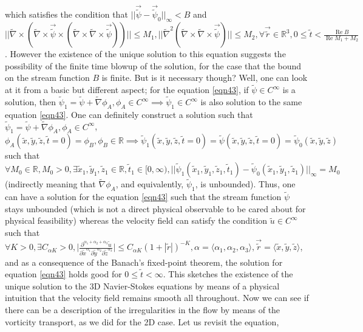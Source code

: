 \documentclass{article}
\begin{document}
which satisfies the condition that $||\vec{\tilde{\psi}}-\vec{\tilde{\psi}}_0||_{\infty}<B$ and $\bigg|\bigg|\tilde{\nabla} \times (\tilde{\nabla} \times \vec{\tilde{\psi}} \times(\tilde{\nabla} \times \tilde{\nabla} \times \vec{\tilde{\psi}}))\bigg|\bigg| \le M_1, \bigg|\bigg|\tilde{\nabla}^2(\tilde{\nabla}\times \tilde{\nabla} \times \vec{\tilde{\psi}})\bigg|\bigg| \le M_2, \forall \vec{\tilde{r}} \in \mathbb{R}^3, 0 \le \tilde{t} < \frac{\operatorname{Re} B}{\operatorname{Re} M_1 + M_2}$. However the existence of the unique solution to this equation suggests the possibility of the finite time blowup of the solution, for the case that the bound on the stream function $B$ is finite. But is it necessary though? Well, one can look at it from a basic but different aspect; for the equation \ref{eqn43}, if $\tilde{\psi} \in C^{\infty}$ is a solution, then $\tilde{\psi}_1 = \tilde{\psi} + \tilde{\nabla} \phi_A, \phi_A \in C^{\infty} \implies \tilde{\psi}_1 \in C^{\infty}$ is also solution to the same equation \ref{eqn43}. One can definitely construct a solution such that $\tilde{\psi}_1 = \tilde{\psi} + \tilde{\nabla} \phi_A, \phi_A \in C^{\infty}$, $\phi_A(\tilde{x}, \tilde{y}, \tilde{z}, \tilde{t} = 0) = \phi_B, \phi_B \in \mathbb{R} \implies \tilde{\psi}_1(\tilde{x}, \tilde{y}, \tilde{z}, \tilde{t} = 0) = \tilde{\psi}(\tilde{x}, \tilde{y}, \tilde{z}, \tilde{t} = 0) = \tilde{\psi}_0(\tilde{x}, \tilde{y}, \tilde{z})$ such that $\forall M_0 \in \mathbb{R}, M_0 > 0, \exists \tilde{x}_1, \tilde{y}_1, \tilde{z}_1 \in \mathbb{R}, \tilde{t}_1 \in [0,\infty), ||\tilde{\psi}_1(\tilde{x}_1,\tilde{y}_1,\tilde{z}_1,\tilde{t}_1)-\tilde{\psi}_0(\tilde{x}_1,\tilde{y}_1,\tilde{z}_1)||_{\infty} = M_0$ (indirectly meaning that $\tilde{\nabla} \phi_A$, and equivalently, $\tilde{\psi}_1$, is unbounded). Thus, one can have a solution for the equation \ref{eqn43} such that the stream function $\tilde{\psi}$ stays unbounded (which is not a direct physical observable to be cared about for physical feasibility) whereas the velocity field can satisfy the condition $\tilde{u} \in C^{\infty}$ such that $\forall K > 0, \exists C_{\alpha K} > 0, \bigg|\frac{\partial^{\alpha_1+\alpha_2+\alpha_3} \tilde{u}}{\partial \tilde{x}^{\alpha_1} \partial \tilde{y}^{\alpha_2} \partial \tilde{z}^{\alpha_3}}\bigg| \le C_{\alpha K}(1+|\tilde{r}|)^{-K}, \alpha = \langle \alpha_1, \alpha_2, \alpha_3\rangle, \vec{\tilde{r}} = \langle \tilde{x}, \tilde{y}, \tilde{z}\rangle$, and as a consequence of the Banach's fixed-point theorem, the solution for equation \ref{eqn43} holds good for $0 \le \tilde{t} < \infty$. This sketches the existence of the unique solution to the 3D Navier-Stokes equations by means of a physical intuition that the velocity field remains smooth all throughout. Now we can see if there can be a description of the irregularities in the flow by means of the vorticity transport, as we did for the 2D case. Let us revisit the equation,
\end{document}
